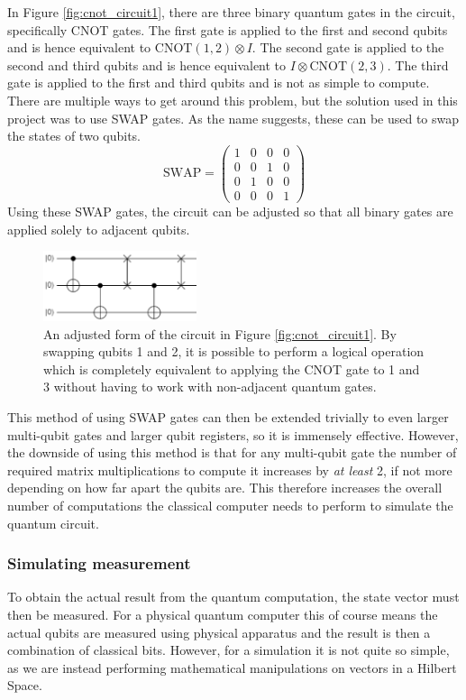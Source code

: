 \documentclass{article}[11pt]
\begin{document}
In Figure \ref{fig:cnot_circuit1}, there are three binary quantum gates in the circuit, specifically CNOT gates. The first gate is applied to the first and second qubits and is hence equivalent to $\text{CNOT}(1,2)\otimes I$. The second gate is applied to the second and third qubits and is hence equivalent to $I\otimes\text{CNOT}(2,3)$. The third gate is applied to the first and third qubits and is not as simple to compute. There are multiple ways to get around this problem, but the solution used in this project was to use SWAP gates. As the name suggests, these can be used to swap the states of two qubits.\cite{nielsenChuang,candela}
\begin{equation}
\text{SWAP}=\begin{pmatrix}
1&0&0&0\\
0&0&1&0\\
0&1&0&0\\
0&0&0&1
\end{pmatrix}
\end{equation}
Using these SWAP gates, the circuit can be adjusted so that all binary gates are applied solely to adjacent qubits.
\begin{figure}[H]
    \centering
    \includegraphics[width=0.4\textwidth]{Pictures/cnot-circuit-swap.png}
    \caption{An adjusted form of the circuit in Figure \ref{fig:cnot_circuit1}. By swapping qubits 1 and 2, it is possible to perform a logical operation which is completely equivalent to applying the CNOT gate to 1 and 3 without having to work with non-adjacent quantum gates.}
    \label{fig:cnot_circuit2}
\end{figure}
This method of using SWAP gates can then be extended trivially to even larger multi-qubit gates and larger qubit registers, so it is immensely effective. However, the downside of using this method is that for any multi-qubit gate the number of required matrix multiplications to compute it increases by \emph{at least} 2, if not more depending on how far apart the qubits are. This therefore increases the overall number of computations the classical computer needs to perform to simulate the quantum circuit.

\subsubsection{Simulating measurement}
To obtain the actual result from the quantum computation, the state vector must then be measured. For a physical quantum computer this of course means the actual qubits are measured using physical apparatus and the result is then a combination of classical bits. However, for a simulation it is not quite so simple, as we are instead performing mathematical manipulations on vectors in a Hilbert Space.
\end{document}
